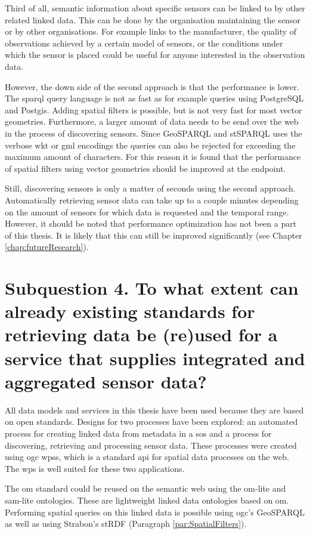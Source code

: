 Third of all, semantic information about specific sensors can be linked to by other related linked data. This can be done by the organisation maintaining the sensor or by other organisations. For example links to the manufacturer, the quality of observations achieved by a certain model of sensors, or the conditions under which the sensor is placed could be useful for anyone interested in the observation data. 

However, the down side of the second approach is that the performance is lower. The \ac{sparql} query language is not as fast as for example queries using PostgreSQL and Postgis. Adding spatial filters is possible, but is not very fast for most vector geometries. Furthermore, a larger amount of data needs to be send over the web in the process of discovering sensors. Since GeoSPARQL and stSPARQL uses the verbose \ac{wkt} or \ac{gml} encodings the queries can also be rejected for exceeding the maximum amount of characters. For this reason it is found that the performance of spatial filters using vector geometries should be improved at the endpoint. 

Still, discovering sensors is only a matter of seconds using the second approach. Automatically retrieving sensor data can take up to a couple minutes depending on the amount of sensors for which data is requested and the temporal range. However, it should be noted that performance optimization has not been a part of this thesis. It is likely that this can still be improved significantly (see Chapter \ref{chap:futureResearch}).              


\section*{\textbf{Subquestion 4.} To what extent can already existing standards for retrieving data be (re)used for a service that supplies integrated and aggregated sensor data?}%

All data models and services in this thesis have been used because they are based on open standards. Designs for two processes have been explored: an automated process for creating linked data from metadata in a \ac{sos} and a process for discovering, retrieving and processing sensor data. These processes were created using \ac{ogc} \aclp{wps}, which is a standard \ac{api} for spatial data processes on the web. The \ac{wps} is well suited for these two applications.

The \ac{om} standard could be reused on the semantic web using the om-lite and sam-lite ontologies. These are lightweight linked data ontologies based on \ac{om}. Performing spatial queries on this linked data is possible using \ac{ogc}'s GeoSPARQL as well as using Strabon's stRDF (Paragraph \ref{par:SpatialFilters}).

